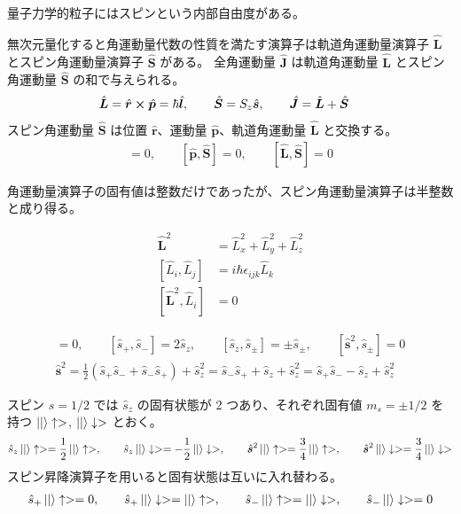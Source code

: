 \documentclass[uplatex,dvipdfmx,a4paper,11pt]{jlreq}
\newcommand{\rr}{\bm{r}}
\newcommand{\pp}{\bm{p}}
\numberwithin{equation}{section}
\theoremstyle{definition}
\begin{document}
量子力学的粒子にはスピンという内部自由度がある。
\begin{definition}[軌道角運動量とスピン角運動量]
  無次元量化すると角運動量代数の性質を満たす演算子は軌道角運動量演算子 $\hat{\bm{L}}$ とスピン角運動量演算子 $\hat{\bm{S}}$ がある。
  全角運動量 $\hat{\bm{J}}$ は軌道角運動量 $\hat{\bm{L}}$ とスピン角運動量 $\hat{\bm{S}}$ の和で与えられる。
  \begin{align}
    \hat{\bm{L}} & = \hat{\rr}\cross\hat{\pp} = \hbar\hat{\bm{l}}, \qquad \hat{\bm{S}} = S_z\hat{\bm{s}}, \qquad \hat{\bm{J}} = \hat{\bm{L}} + \hat{\bm{S}}
  \end{align}
  スピン角運動量 $\hat{\bm{S}}$ は位置 $\hat{\rr}$、運動量 $\hat{\pp}$、軌道角運動量 $\hat{\bm{L}}$ と交換する。
  \begin{align}
    [\hat{\rr}, \hat{\bm{S}}] = 0, \qquad [\hat{\pp}, \hat{\bm{S}}] = 0, \qquad [\hat{\bm{L}}, \hat{\bm{S}}] = 0
  \end{align}
\end{definition}
角運動量演算子の固有値は整数だけであったが、スピン角運動量演算子は半整数と成り得る。
\begin{proposition}
  \begin{align}
    \hat{\bm{L}}^2              & = \hat{L}_x^2 + \hat{L}_y^2 + \hat{L}_z^2 \\
    [\hat{L}_i, \hat{L}_j]      & = i\hbar\epsilon_{ijk}\hat{L}_k           \\
    [\hat{\bm{L}}^2, \hat{L}_i] & = 0
  \end{align}
\end{proposition}

\begin{proposition}
  \begin{align}
    [\hat{\bm{s}}^2, \hat{s}_z] = 0, \qquad [\hat{s}_+, \hat{s}_-] = 2\hat{s}_z, \qquad [\hat{s}_z, \hat{s}_\pm] = \pm \hat{s}_\pm, \qquad [\hat{\bm{s}}^2, \hat{s}_\pm] = 0 \\
    \hat{\bm{s}}^2 = \frac{1}{2}(\hat{s}_+\hat{s}_- + \hat{s}_-\hat{s}_+) + \hat{s}_z^2 = \hat{s}_-\hat{s}_+ + \hat{s}_z + \hat{s}_z^2 = \hat{s}_+\hat{s}_- - \hat{s}_z + \hat{s}_z^2
  \end{align}
\end{proposition}

\begin{proposition}
  スピン $s = 1/2$ では $\hat{s}_z$ の固有状態が 2 つあり、それぞれ固有値 $m_s = \pm1/2$ を持つ $\ket|\uparrow>$, $\ket|\downarrow>$ とおく。
  \begin{align}
    \hat{s}_z\ket|\uparrow> = \frac{1}{2}\ket|\uparrow>, \qquad \hat{s}_z\ket|\downarrow> = -\frac{1}{2}\ket|\downarrow>, \qquad \hat{\bm{s}}^2\ket|\uparrow> = \frac{3}{4}\ket|\uparrow>, \qquad \hat{\bm{s}}^2\ket|\downarrow> = \frac{3}{4}\ket|\downarrow>
  \end{align}
  スピン昇降演算子を用いると固有状態は互いに入れ替わる。
  \begin{align}
    \hat{s}_+\ket|\uparrow> = 0, \qquad \hat{s}_+\ket|\downarrow> = \ket|\uparrow>, \qquad \hat{s}_-\ket|\uparrow> = \ket|\downarrow>, \qquad \hat{s}_-\ket|\downarrow> = 0
  \end{align}
\end{proposition}
\end{document}
